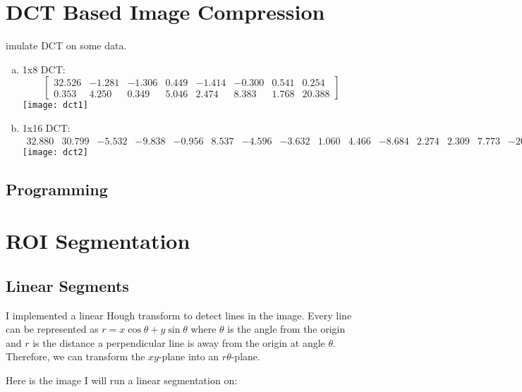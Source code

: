 \documentclass[12pt]{article}
\newenvironment{question}[2][Question]{\begin{trivlist}
\item[\hskip \labelsep{\bfseries #1}\hskip \labelsep{\bfseries #2.}]}{\end{trivlist}}
\begin{document}
\section{DCT Based Image Compression}

\setcounter{MaxMatrixCols}{20}
\begin{question}[1]
Simulate DCT on some data.
\begin{enumerate}[(a)]
  \item 1x8 DCT: \[
\begin{bmatrix}
 32.526 &
 -1.281&  
 -1.306&
  0.449&
 -1.414&
 -0.300&
  0.541&
  0.254\\
 0.353 & 
 4.250 &
 0.349 &
 5.046 &
 2.474 &
 8.383 &
 1.768 &
20.388

\end{bmatrix}
\]
\texttt{[image: dct1]}\\
\item 1x16 DCT:
\[
\begin{smallmatrix}
 32.880 & 
 30.799 &
 -5.532 &
 -9.838 &
 -0.956 &
  8.537 &
 -4.596 &
 -3.632 &
  1.060 &
  4.466 &
 -8.684 &
  2.274 &
  2.309 &
  7.773 &
-20.133 &
 19.182

\end{smallmatrix}
\]
\texttt{[image: dct2]}\\
\end{enumerate}
\end{question}

\subsection{Programming}

\section{ROI Segmentation}

\subsection{Linear Segments}

I implemented a linear Hough transform to detect lines in the image. Every line
can be represented as $r = x\cos{\theta} + y\sin{\theta}$ where $\theta$ is the
angle from the origin and $r$ is the distance a perpendicular line is away from
the origin at angle $\theta$. Therefore, we can transform the $xy$-plane into an
$r\theta$-plane.

Here is the image I will run a linear segmentation on:\\
\end{document}
